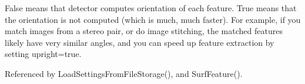 False means that detector computes orientation of each feature. True means that the orientation is not computed (which is much, much faster). For example, if you match images from a stereo pair, or do image stitching, the matched features likely have very similar angles, and you can speed up feature extraction by setting upright=true. 



Referenced by Load\-Settings\-From\-File\-Storage(), and Surf\-Feature().

